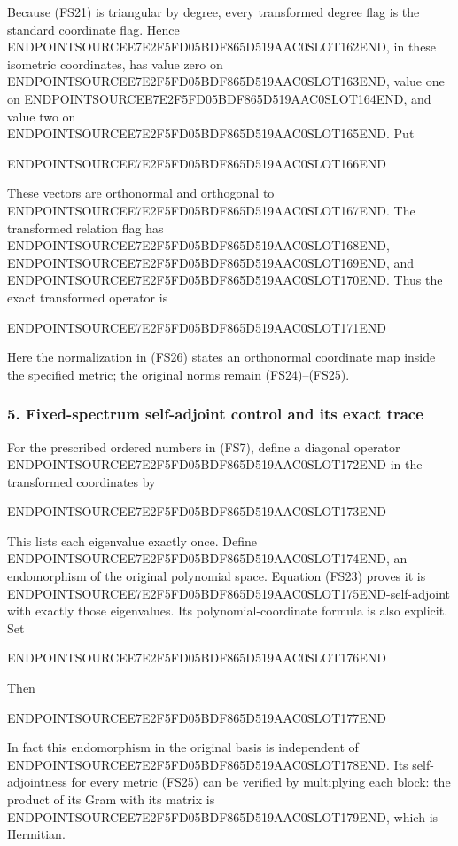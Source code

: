 Because (FS21) is triangular by degree, every transformed degree flag is the standard coordinate flag. Hence ENDPOINTSOURCEE7E2F5FD05BDF865D519AAC0SLOT162END, in these isometric coordinates, has value zero on ENDPOINTSOURCEE7E2F5FD05BDF865D519AAC0SLOT163END, value one on ENDPOINTSOURCEE7E2F5FD05BDF865D519AAC0SLOT164END, and value two on ENDPOINTSOURCEE7E2F5FD05BDF865D519AAC0SLOT165END. Put

ENDPOINTSOURCEE7E2F5FD05BDF865D519AAC0SLOT166END

These vectors are orthonormal and orthogonal to ENDPOINTSOURCEE7E2F5FD05BDF865D519AAC0SLOT167END. The transformed relation flag has ENDPOINTSOURCEE7E2F5FD05BDF865D519AAC0SLOT168END, ENDPOINTSOURCEE7E2F5FD05BDF865D519AAC0SLOT169END, and ENDPOINTSOURCEE7E2F5FD05BDF865D519AAC0SLOT170END. Thus the exact transformed operator is

ENDPOINTSOURCEE7E2F5FD05BDF865D519AAC0SLOT171END

Here the normalization in (FS26) states an orthonormal coordinate map inside the specified metric; the original norms remain (FS24)--(FS25).

\subsubsection{5. Fixed-spectrum self-adjoint control and its exact trace}\label{endpoint-four_window_sharpness--fixed-spectrum-self-adjoint-control-and-its-exact-trace}

For the prescribed ordered numbers in (FS7), define a diagonal operator ENDPOINTSOURCEE7E2F5FD05BDF865D519AAC0SLOT172END in the transformed coordinates by

ENDPOINTSOURCEE7E2F5FD05BDF865D519AAC0SLOT173END

This lists each eigenvalue exactly once. Define ENDPOINTSOURCEE7E2F5FD05BDF865D519AAC0SLOT174END, an endomorphism of the original polynomial space. Equation (FS23) proves it is ENDPOINTSOURCEE7E2F5FD05BDF865D519AAC0SLOT175END-self-adjoint with exactly those eigenvalues. Its polynomial-coordinate formula is also explicit. Set

ENDPOINTSOURCEE7E2F5FD05BDF865D519AAC0SLOT176END

Then

ENDPOINTSOURCEE7E2F5FD05BDF865D519AAC0SLOT177END

In fact this endomorphism in the original basis is independent of ENDPOINTSOURCEE7E2F5FD05BDF865D519AAC0SLOT178END. Its self-adjointness for every metric (FS25) can be verified by multiplying each block: the product of its Gram with its matrix is ENDPOINTSOURCEE7E2F5FD05BDF865D519AAC0SLOT179END, which is Hermitian.


